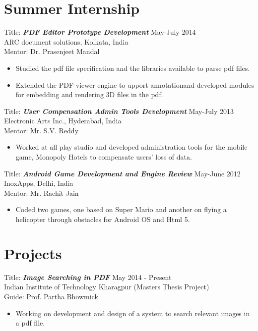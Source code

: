 \documentclass[hidelinks,margin,line,10pt,a4paper]{resume}
\begin{document}
\begin{resume}
    \section{\mysidestyle Summer Internship}

Title: \textbf{\emph{PDF Editor Prototype Development }} \hfill May-July 2014 \\
ARC document solutions, Kolkata, India \\
Mentor: Dr. Prasenjeet Mandal
\vspace{2mm}%
\begin{itemize}
\item Studied the pdf file specification and the libraries available to parse pdf files.
\item Extended the PDF viewer engine to upport annotationand developed modules for embedding and rendering 3D files in the pdf.
\end{itemize}

Title: \textbf{\emph{User Compensation Admin Tools Development }} \hfill May-July 2013 \\
Electronic Arts Inc., Hyderabad, India \\
Mentor: Mr. S.V. Reddy
\vspace{2mm}%
\begin{itemize}
\item Worked at all play studio and developed administration tools for the mobile game, Monopoly Hotels to compensate users’ loss of data. 
\end{itemize}


Title: \textbf{\emph{Android Game Development and Engine Review }} \hfill May-June 2012 \\
InoxApps, Delhi, India \\
Mentor: Mr. Rachit Jain
\vspace{2mm}%
\begin{itemize}
\item Coded two games, one based on Super Mario and another on flying a helicopter through obstacles for Android OS and Html 5.
\end{itemize}

    \section{\mysidestyle Projects}

Title: \textbf{\emph {Image Searching in PDF }} \hfill May 2014 - Present \\ Indian Institute of Technology Kharagpur \hfill (Masters Thesis Project) \\
Guide: Prof. Partha Bhowmick
\vspace{2mm}%
\begin{itemize}
\item Working on development and design of a system to search relevant images in a pdf file.
\end{itemize}



\end{resume}
\end{document}
